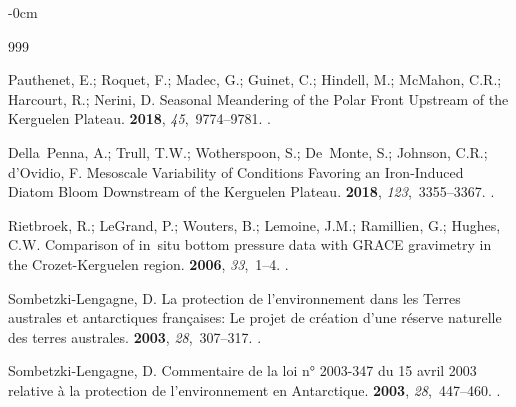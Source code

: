 \documentclass[geomatics,article,accept,pdftex,moreauthors]{Definitions/mdpi}
\begin{document}
\begin{adjustwidth}{-\extralength}{0cm}
\begin{thebibliography}{999}
 
Pauthenet, E.; Roquet, F.; Madec, G.; Guinet, C.; Hindell, M.; McMahon, C.R.;
  Harcourt, R.; Nerini, D.
\newblock Seasonal Meandering of the Polar Front Upstream of the Kerguelen
  Plateau.
 {\bf 2018}, {\em 45},~9774--9781.
.

Della~Penna, A.; Trull, T.W.; Wotherspoon, S.; De~Monte, S.; Johnson, C.R.;
  d'Ovidio, F.
\newblock Mesoscale Variability of Conditions Favoring an Iron-Induced Diatom
  Bloom Downstream of the Kerguelen Plateau.
 {\bf 2018}, {\em
  123},~3355--3367.
.

Rietbroek, R.; LeGrand, P.; Wouters, B.; Lemoine, J.M.; Ramillien, G.; Hughes,
  C.W.
\newblock Comparison of in~situ bottom pressure data with GRACE gravimetry in
  the Crozet-Kerguelen region.
 {\bf 2006}, \emph{33},~1--4. %
.

Sombetzki-Lengagne, D.
\newblock La protection de l'environnement dans les Terres australes et
  antarctiques françaises: Le projet de création d'une réserve naturelle
  des terres australes.
 {\bf 2003}, {\em
  28},~307--317.
.

Sombetzki-Lengagne, D.
\newblock Commentaire de la loi n° 2003-347 du 15 avril 2003 relative à la
  protection de l'environnement en Antarctique.
 {\bf 2003}, {\em
  28},~447--460.
.


\end{thebibliography}
\end{adjustwidth}
\end{document}
